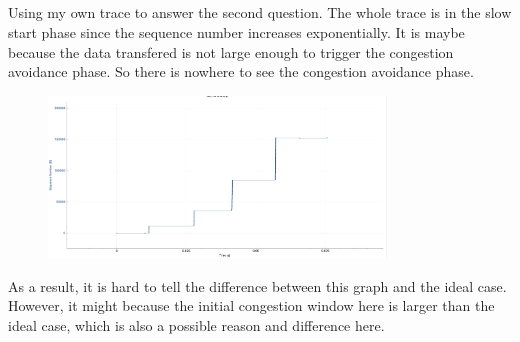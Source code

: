 \documentclass{article}
\begin{document}
\begin{CJK*}{UTF8}{gbsn}
\subsection{}
Using my own trace to answer the second question.
The whole trace is in the slow start phase since the sequence number increases exponentially.
It is maybe because the data transfered is not large enough to trigger the congestion avoidance phase.
So there is nowhere to see the congestion avoidance phase.
\begin{figure}[H]
    \centering
    \includegraphics[width=0.8\textwidth]{14-1.png}
\end{figure}
As a result, it is hard to tell the difference between this graph and
the ideal case. However, it might because the initial congestion window here
is larger than the ideal case, which is also a possible reason and difference here.
\end{CJK*}
\end{document}
